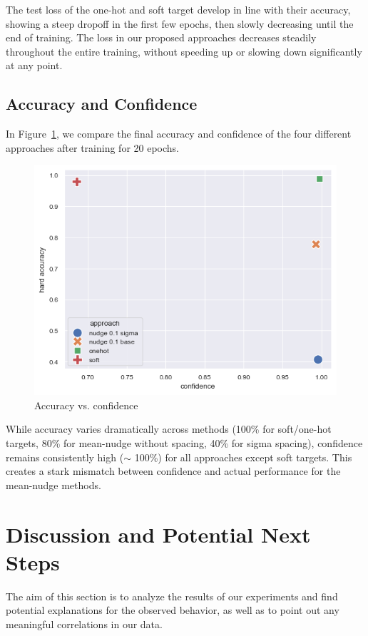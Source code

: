 \documentclass[12pt,fleqn,a4paper]{article}
\begin{document}
The test loss of the one-hot and soft target develop in line with their accuracy, showing a steep dropoff in the first few epochs, then slowly decreasing until the end of training. The loss in our proposed approaches decreases steadily throughout the entire training, without speeding up or slowing down significantly at any point.

\subsection{Accuracy and Confidence}
In Figure~\ref{fig:accvconf}, we compare the final accuracy and confidence of the four different approaches after training for 20 epochs.
\begin{figure}[H]
    \centering
    \includegraphics[width=0.5\linewidth]{graphs/accvconf.png}
    \caption{Accuracy vs. confidence}
    \label{fig:accvconf}
\end{figure}

While accuracy varies dramatically across methods (100\% for soft/one-hot targets, 80\% for mean-nudge without spacing, 40\% for sigma spacing), confidence remains consistently high ($\sim$ 100\%) for all approaches except soft targets. This creates a stark mismatch between confidence and actual performance for the mean-nudge methods.

\section{Discussion and Potential Next Steps}
The aim of this section is to analyze the results of our experiments and find potential explanations for the observed behavior, as well as to point out any meaningful correlations in our data.
\end{document}
